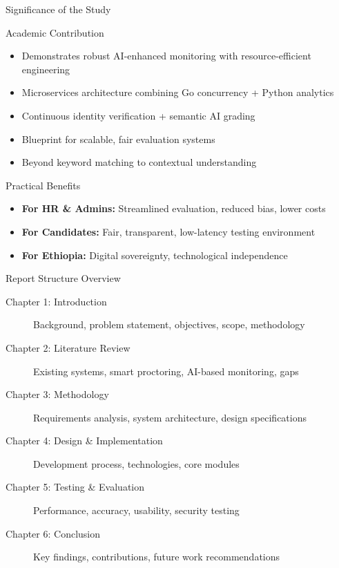 \begin{frame}{Significance of the Study}
    \begin{block}{Academic Contribution}
        \begin{itemize}
            \item Demonstrates robust AI-enhanced monitoring with resource-efficient engineering
            \item Microservices architecture combining Go concurrency + Python analytics
            \item Continuous identity verification + semantic AI grading
            \item Blueprint for scalable, fair evaluation systems
            \item Beyond keyword matching to contextual understanding
        \end{itemize}
    \end{block}
    
    \begin{block}{Practical Benefits}
        \begin{itemize}
            \item \textbf{For HR \& Admins:} Streamlined evaluation, reduced bias, lower costs
            \item \textbf{For Candidates:} Fair, transparent, low-latency testing environment
            \item \textbf{For Ethiopia:} Digital sovereignty, technological independence
        \end{itemize}
    \end{block}
\end{frame}

\begin{frame}{Report Structure Overview}
    \begin{description}
        \item[Chapter 1: Introduction] Background, problem statement, objectives, scope, methodology
        \item[Chapter 2: Literature Review] Existing systems, smart proctoring, AI-based monitoring, gaps
        \item[Chapter 3: Methodology] Requirements analysis, system architecture, design specifications
        \item[Chapter 4: Design \& Implementation] Development process, technologies, core modules
        \item[Chapter 5: Testing \& Evaluation] Performance, accuracy, usability, security testing
        \item[Chapter 6: Conclusion] Key findings, contributions, future work recommendations
    \end{description}
\end{frame}
